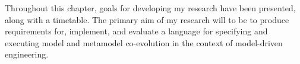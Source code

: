 Throughout this chapter, goals for developing my research have been presented, along with a timetable. The primary aim of my research will to be to produce requirements for, implement, and evaluate a language for specifying and executing model and metamodel co-evolution in the context of model-driven engineering.